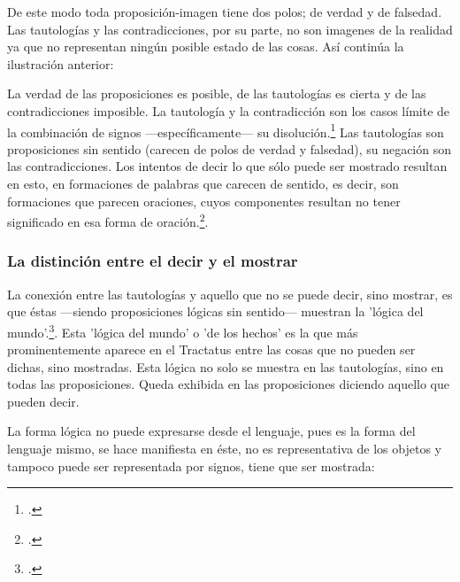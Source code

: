         De este modo toda proposición-imagen tiene dos polos; de verdad y de falsedad.
        Las tautologías y las contradicciones, por su parte, no son imagenes de la
        realidad ya que no representan ningún posible estado de las cosas. Así continúa
        la ilustración anterior:


        La verdad de las proposiciones es posible, de las tautologías es cierta y de las
        contradicciones imposible. La tautología y la contradicción son los casos límite
        de la combinación de signos ---específicamente--- su
        disolución.\footcite[cf.~][4.464 y 4.466]{tractatus} Las tautologías son
        proposiciones sin sentido (carecen de polos de verdad y falsedad), su negación son
        las contradicciones. Los intentos de decir lo que sólo puede ser mostrado
        resultan en esto, en formaciones de palabras que carecen de sentido, es decir,
        son formaciones que parecen oraciones, cuyos componentes resultan no tener
        significado en esa forma de oración.\footcite[cf.~][p.~163~\S2]{IWT}.

        \subsubsection{La distinción entre el decir y el mostrar}
        La conexión entre las tautologías y aquello que no se puede decir, sino mostrar,
        es que éstas ---siendo proposiciones lógicas sin sentido--- muestran la 'lógica del
        mundo'.\footcite[cf.~][p.~163~\S3]{IWT}. Esta 'lógica del mundo' o 'de los
        hechos' es la que más prominentemente aparece en el Tractatus entre las cosas
        que no pueden ser dichas, sino mostradas. Esta lógica no solo se muestra en las
        tautologías, sino en todas las proposiciones. Queda exhibida en las proposiciones
        diciendo aquello que pueden decir. 

        La forma lógica no puede expresarse desde el lenguaje, pues es la forma del
        lenguaje mismo, se hace manifiesta en éste, no es representativa de los objetos
        y tampoco puede ser representada por signos, tiene que ser mostrada:

